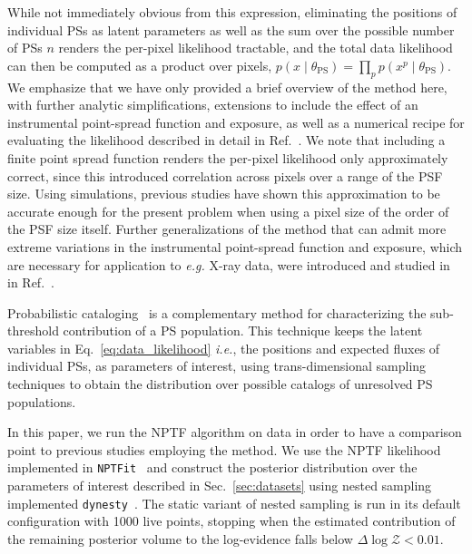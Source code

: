 \documentclass[prd,aps,10pt,nofootinbib,twocolumn,superscriptaddress,preprintnumbers,balancelastpage,longbibliography]{revtex4-1}
\begin{document}
While not immediately obvious from this expression, eliminating the positions of individual PSs as latent parameters as well as the sum over the possible number of PSs $n$ renders the per-pixel likelihood tractable, and the total data likelihood can then be computed as a product over pixels, $p(x\mid\theta_\mathrm{PS}) = \prod_{p} p(x^p\mid\theta_\mathrm{PS})$. We emphasize that we have only provided a brief overview of the method here, with further analytic simplifications, extensions to include the effect of an instrumental point-spread function and exposure, as well as a numerical recipe for evaluating the likelihood described in detail in Ref.~\cite{Mishra-Sharma:2016gis}. We note that including a finite point spread function renders the per-pixel likelihood only approximately correct, since this introduced correlation across pixels over a range of the PSF size. Using simulations, previous studies have shown this approximation to be accurate enough for the present problem when using a pixel size of the order of the PSF size itself. Further generalizations of the method that can admit more extreme variations in the instrumental point-spread function and exposure, which are necessary for application to \emph{e.g.} X-ray data, were introduced and studied in in Ref.~\cite{Collin:2021ufc}. 

Probabilistic cataloging~\cite{Daylan:2016tia} is a complementary method for characterizing the sub-threshold contribution of a PS population. This technique keeps the latent variables in Eq.~\eqref{eq:data_likelihood} \emph{i.e.}, the positions and expected fluxes of individual PSs, as parameters of interest, using trans-dimensional sampling techniques to obtain the distribution over possible catalogs of unresolved PS populations.

In this paper, we run the NPTF algorithm on \Fermi data in order to have a comparison point to previous studies employing the method. We use the NPTF likelihood implemented in \texttt{NPTFit}~\cite{Mishra-Sharma:2016gis} and construct the posterior distribution over the parameters of interest described in Sec.~\ref{sec:datasets} using nested sampling implemented \texttt{dynesty}~\cite{Speagle_2020}. The static variant of nested sampling is run in its default configuration with 1000 live points, stopping when the estimated contribution of the remaining posterior volume to the log-evidence falls below $\Delta \log \mathcal Z < 0.01$.
\end{document}
